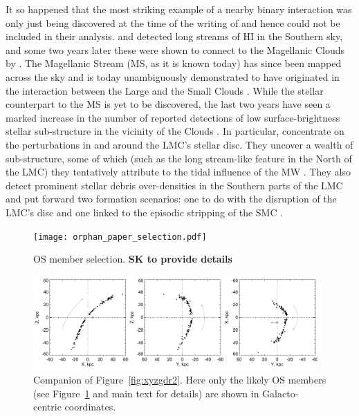 \documentclass[a4paper,useAMS,usenatbib]{mnras}
\begin{document}
It so happened that the most striking example of a nearby binary
interaction was only just being discovered at the time of the writing
of \citet{Toomre1972} and hence could not be included in their
analysis. \citet{Wannier1972} and \citet{Kuilenburg1972} detected long
streams of HI in the Southern sky, and some two years later these were
shown to connect to the Magellanic Clouds by
\citet{Mathewson1974}. The Magellanic Stream (MS, as it is known
today) has since been mapped across the sky \citep[see
  e.g.][]{Putman2003,Nidever2008,Nidever2010} and is today
unambiguously demonstrated to have originated in the interaction
between the Large and the Small Clouds \citep[LMC and
  SMC,][]{Besla2007, Besla2010, Diaz2011, Diaz2012}. While the stellar
counterpart to the MS is yet to be discovered, the last two years have
seen a marked increase in the number of reported detections of low
surface-brightness stellar sub-structure in the vicinity of the Clouds
\citep[see
  e.g.][]{Mackey2016,Belokurov2016,Belokurov2017,Deason2017,Pieres2017,Mackey2018,Nidever2018}. In
particular, \citet{Mackey2016,Mackey2018} concentrate on the
perturbations in and around the LMC's stellar disc. They uncover a
wealth of sub-structure, some of which (such as the long stream-like
feature in the North of the LMC) they tentatively attribute to the
tidal influence of the MW \citep[][]{Mackey2016}. They also
detect prominent stellar debris over-densities in the Southern parts
of the LMC and put forward two formation scenarios: one to do with the
disruption of the LMC's disc and one linked to the episodic stripping
of the SMC \citep[see also][who argued for the importance of repeated
  interactions with the SMC]{besla_etal_2016}.

%
\begin{figure}
  \centering
  \texttt{[image: orphan\_paper\_selection.pdf]}
  \caption[]{OS member selection. {\bf SK to provide details}}
   \label{fig:selection}
\end{figure}
%


%
\begin{figure}
  \centering
  \includegraphics[width=0.97\textwidth]{orphan_paper_xyz_members.pdf}
  \caption[]{Companion of Figure~\ref{fig:xyzgdr2}. Here only the
    likely OS members (see Figure~\ref{fig:selection} and main text
    for details) are shown in Galacto-centric coordinates.}
   \label{fig:xyzmem}
\end{figure}
%
\end{document}
